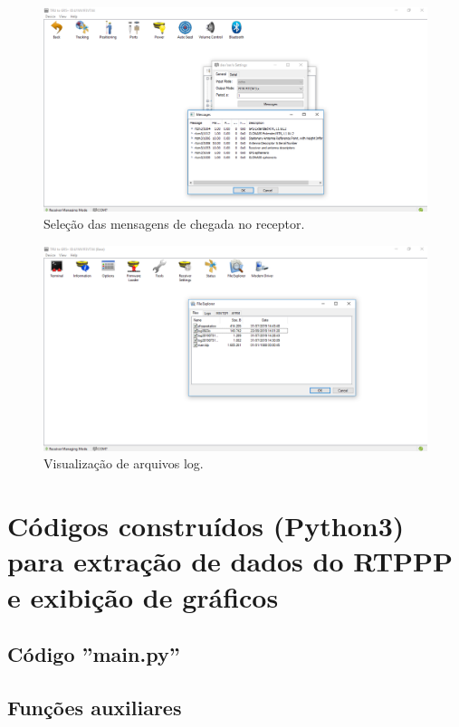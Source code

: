 \begin{figure}[H]
\centering
\includegraphics[scale=0.4]{img/15.png} %
\caption{Seleção das mensagens de chegada no receptor.}
\label{Rotulo}
\end{figure}

\begin{figure}[H]
\centering
\includegraphics[scale=0.4]{img/17.png} %
\caption{ Visualização de arquivos log.}
\label{Rotulo}
\end{figure}


\section{Códigos construídos (Python3) para extração de dados do RTPPP e exibição de gráficos}
\subsection{Código ''main.py''}


\subsection{Funções auxiliares}


